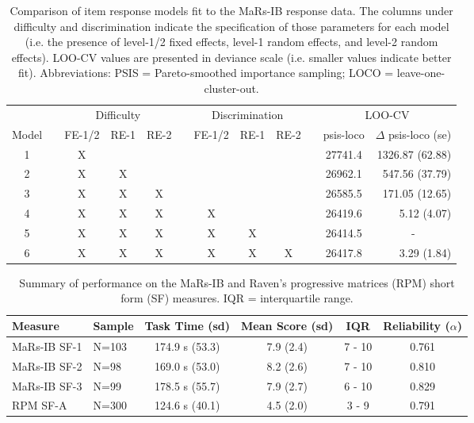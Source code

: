 \documentclass[a4paper,man,natbib]{apa6}
\begin{document}
\begin{table}
    \centering
    \begin{tabular*}{1.02\textwidth}{cccccccccccr}
    \toprule
    && \multicolumn{3}{c}{Difficulty} && \multicolumn{3}{c}{Discrimination} && \multicolumn{2}{c}{LOO-CV} \\
    \cmidrule(lr){3-5}\cmidrule(lr){7-9}\cmidrule(lr){11-12}
    Model && {\small FE-1/2} & {\small RE-1} & {\small RE-2} && {\small FE-1/2} & {\small RE-1} & {\small RE-2} && psis-loco & $\Delta$ psis-loco (se) \\
    \midrule
    1 && X &   &   &&   &   &   && 27741.4 & 1326.87 (62.88) \\
    2 && X & X &   &&   &   &   && 26962.1 & 547.56 (37.79) \\
    3 && X & X & X &&   &   &   && 26585.5 & 171.05 (12.65) \\
    4 && X & X & X && X &   &   && 26419.6 & 5.12 (4.07) \\
    5 && X & X & X && X & X &   && 26414.5 & \multicolumn{1}{c}{-} \\
    6 && X & X & X && X & X & X && 26417.8 & 3.29 (1.84) \\
    \bottomrule
    \end{tabular*}
    \caption{\label{tab:2}\normalfont Comparison of item response models fit to the MaRs-IB response data. The columns under difficulty and discrimination indicate the specification of those parameters for each model (i.e. the presence of level-1/2 fixed effects, level-1 random effects, and level-2 random effects). LOO-CV values are presented in deviance scale (i.e. smaller values indicate better fit). Abbreviations: PSIS = Pareto-smoothed importance sampling; LOCO = leave-one-cluster-out.}
    \label{table:2}
\end{table}

\begin{table}
    \centering
    \begin{tabular*}{\textwidth}{llcccc}
    \toprule
    Measure & Sample & Task Time (sd) & Mean Score (sd) & IQR & Reliability ($\alpha$) \\
    \midrule
    MaRs-IB SF-1 & N=103 & 174.9 s (53.3) & 7.9 (2.4) & 7 - 10 & 0.761 \\
    MaRs-IB SF-2 & N=98  & 169.0 s (53.0) & 8.2 (2.6) & 7 - 10 & 0.810 \\
    MaRs-IB SF-3 & N=99  & 178.5 s (55.7) & 7.9 (2.7) & 6 - 10 & 0.829 \\
    RPM SF-A     & N=300 & 124.6 s (40.1) & 4.5 (2.0) & 3 - 9 & 0.791 \\
    \bottomrule
    \end{tabular*}
    \caption{\label{table:3}\normalfont Summary of performance on the MaRs-IB and Raven's progressive matrices (RPM) short form (SF) measures. IQR = interquartile range.}
\end{table}
\end{document}
